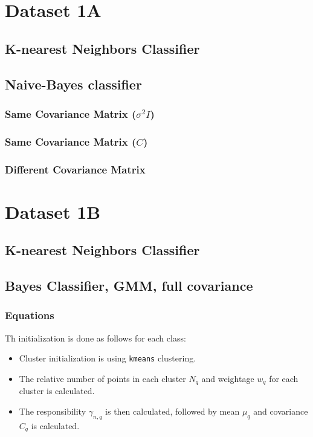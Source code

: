 \documentclass[11pt,a4paper]{article}
\def\tt#1{\texttt{#1}}
\begin{document}
{\hypersetup{linkcolor=black}
 \tableofcontents}
\break


\section{Dataset 1A}
\subsection{K-nearest Neighbors Classifier}
\subsection{Naive-Bayes classifier}
\subsubsection{Same Covariance Matrix ($\sigma^2I$)}
\subsubsection{Same Covariance Matrix ($C$)}
\subsubsection{Different Covariance Matrix}

\break
\section{Dataset 1B}
\subsection{K-nearest Neighbors Classifier}
\subsection{Bayes Classifier, GMM, full covariance}
\subsubsection{Equations}
Th initialization is done as follows for each class:
\begin{itemize}
    \itemsep0em
    \item Cluster initialization is using \tt{kmeans} clustering.
    \item The relative number of points in each cluster $N_q$ and weightage $w_q$ for each cluster is calculated.
    \item The responsibility $\gamma_{n,q}$ is then calculated, followed by mean $\mu_q$ and covariance $C_q$ is calculated.
\end{itemize}
\end{document}
